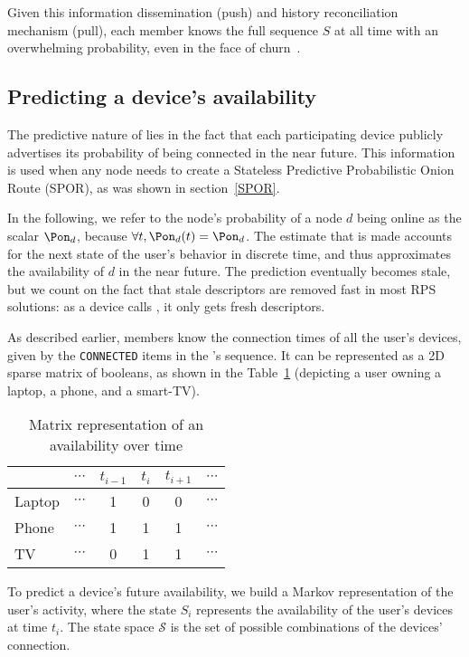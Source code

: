 Given this information dissemination (push) and history reconciliation mechanism (pull), each \squad member knows the full sequence $S$ at all time with an overwhelming probability, even in the face of churn~\cite{luxey:cascade}.

\subsection{Predicting a device's availability}
\label{ssec:device_availability}

The predictive nature of \name lies in the fact that each participating device publicly advertises its probability of being connected in the near future. 
This information is used when any node needs to create a Stateless Predictive Probabilistic Onion Route (\acs{SPOR}), as was shown in section~\ref{SPOR}.

In the following, we refer to the node's probability of a node $d$ being online as the scalar $\Pon_d$, because $\forall t, \Pon_d(t) = \Pon_d$.
The estimate that is made accounts for the next state of the user's behavior in discrete time, and thus approximates the availability of $d$ in the near future.
The prediction eventually becomes stale, but we count on the fact that stale descriptors are removed fast in most RPS solutions: 
as a device calls \GetRandomNode, it only gets fresh descriptors.

As described earlier, \squad members know the connection times of all the user's devices, given by the \texttt{CONNECTED} items in the \squad's sequence.
It can be represented as a 2D sparse matrix of booleans, as shown in the Table~\ref{tab:connection_times} (depicting a user owning a laptop, a phone, and a smart-TV).


\begin{table}
\caption{Matrix representation of an \squad availability over time}
\centering
\begin{tabular}{@{}lccccc@{}} \toprule
		& $\cdots$	& $t_{i-1}$	& $t_i$		& $t_{i+1}$	& $\cdots$ \\ \midrule
Laptop	& $\cdots$	& 1			& 0			& 0			& $\cdots$ \\
Phone	& $\cdots$	& 1			& 1			& 1			& $\cdots$ \\
TV		& $\cdots$	& 0			& 1			& 1			& $\cdots$ \\ \bottomrule
\end{tabular}
\label{tab:connection_times}
\end{table}

To predict a device's future availability, we build a Markov representation of the user's activity, 
where the state $S_i$ represents the availability of the user's devices at time $t_i$.
The state space $\mathcal{S}$ is the set of possible combinations of the devices' connection.

